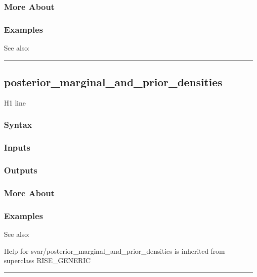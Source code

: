 \documentclass[letterpaper,10pt,english]{sphinxmanual}
\begin{document}
\subsubsection{More About}
\label{classes/models/@svar/svar:id68}

\subsubsection{Examples}
\label{classes/models/@svar/svar:id69}
See also:


\bigskip\hrule{}\bigskip



\subsection{posterior\_marginal\_and\_prior\_densities}
\label{classes/models/@svar/svar:id70}\label{classes/models/@svar/svar:posterior-marginal-and-prior-densities}
H1 line


\subsubsection{Syntax}
\label{classes/models/@svar/svar:id71}

\subsubsection{Inputs}
\label{classes/models/@svar/svar:id72}

\subsubsection{Outputs}
\label{classes/models/@svar/svar:id73}

\subsubsection{More About}
\label{classes/models/@svar/svar:id74}

\subsubsection{Examples}
\label{classes/models/@svar/svar:id75}
See also:

Help for svar/posterior\_marginal\_and\_prior\_densities is inherited from superclass RISE\_GENERIC


\bigskip\hrule{}\bigskip
\end{document}
